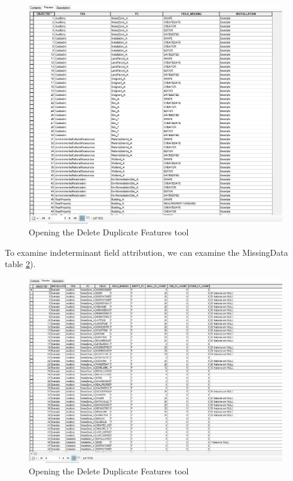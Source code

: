 \documentclass[openany]{book}
\theoremstyle{definition}
\theoremstyle{definition}
\theoremstyle{definition}
\theoremstyle{remark}
\begin{document}
\begin{figure}[H]

{\centering \includegraphics{figures/indtSearch-missingFLDs} 

}

\caption{Opening the Delete Duplicate Features tool}\label{fig:indtSearchmissingFLDs}
\end{figure}

To examine indeterminant field attribution, we can examine the
MissingData table \ref{fig:indtSearchmissingData}).

\begin{figure}[H]

{\centering \includegraphics{figures/indtSearch-missingData} 

}

\caption{Opening the Delete Duplicate Features tool}\label{fig:indtSearchmissingData}
\end{figure}
\end{document}
